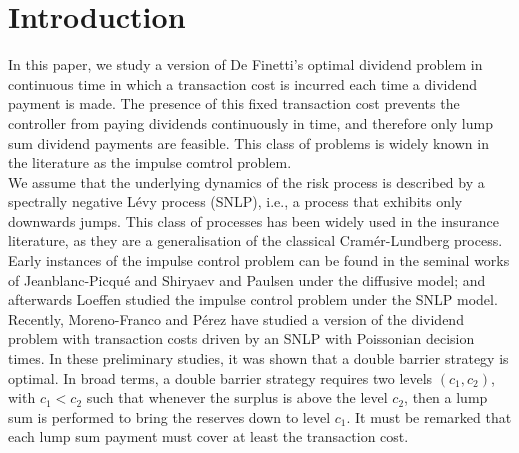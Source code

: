 \documentclass[11pt,reqno]{amsart}
\begin{document}
\section{Introduction}
In this paper, we study a version of De Finetti's optimal dividend problem in continuous time in which a transaction cost is incurred each time a dividend payment is made. The presence of this fixed transaction cost prevents the controller from paying dividends continuously in time, and therefore only lump sum dividend payments are feasible. This class of problems is widely known in the literature as the impulse comtrol problem.\\
We assume that the underlying dynamics of the risk process is described by a spectrally negative L\'evy process (SNLP), i.e., a process that exhibits only downwards jumps. This class of processes has been widely used in the insurance literature, as they are a generalisation of the classical Cram\'er-Lundberg process. Early instances of the impulse control problem can be found in the seminal works of Jeanblanc-Picqu\'e and Shiryaev \cite{JS1995} and Paulsen \cite{Paulsen2007} under the diffusive model; and afterwards  Loeffen \cite{loeffen2009} studied the impulse control problem under the SNLP model. Recently, Moreno-Franco and P\'erez \cite{MP2024} have studied a version of the dividend problem with transaction costs driven by an SNLP with Poissonian decision times. In these preliminary studies, it was shown that a double barrier strategy is optimal. In broad terms, a double barrier strategy requires two levels $(c_1,c_2)$, with $c_1 < c_2$ such that whenever the surplus is above the level $c_2$, then a lump sum is performed to bring the reserves down to level $c_1$. It must be remarked that each lump sum payment must cover at least the transaction cost.\\
\end{document}
